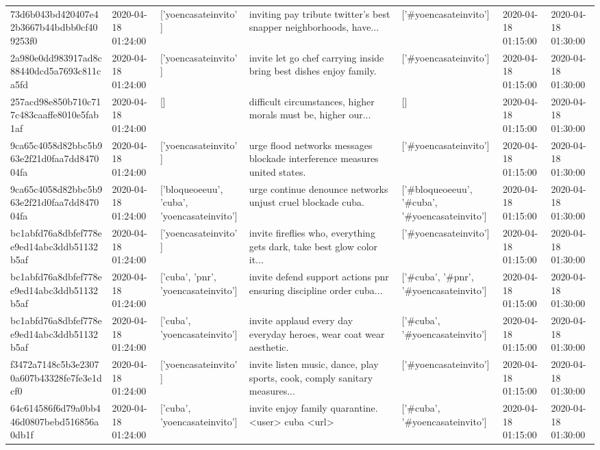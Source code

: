 \begin{tabular}{lllllll}
73d6b043bd420407e42b3667b44bdbb0cf409253f0 & 2020-04-18 01:24:00 & ['yoencasateinvito'] & inviting pay tribute twitter's best snapper neighborhoods, have... & ['#yoencasateinvito'] & 2020-04-18 01:15:00 & 2020-04-18 01:30:00 \\
2a980e0dd983917ad8c88440dcd5a7693c811ca5fd & 2020-04-18 01:24:00 & ['yoencasateinvito'] & invite let go chef carrying inside bring best dishes enjoy family. & ['#yoencasateinvito'] & 2020-04-18 01:15:00 & 2020-04-18 01:30:00 \\
257acd98e850b710c717c483caaffe8010e5fab1af & 2020-04-18 01:24:00 & [] & difficult circumstances, higher morals must be, higher our... & [] & 2020-04-18 01:15:00 & 2020-04-18 01:30:00 \\
9ca65c4058d82bbc5b963e2f21d0faa7dd847004fa & 2020-04-18 01:24:00 & ['yoencasateinvito'] & urge flood networks messages blockade interference measures united states. & ['#yoencasateinvito'] & 2020-04-18 01:15:00 & 2020-04-18 01:30:00 \\
9ca65c4058d82bbc5b963e2f21d0faa7dd847004fa & 2020-04-18 01:24:00 & ['bloqueoeeuu', 'cuba', 'yoencasateinvito'] & urge continue denounce networks unjust cruel blockade cuba. & ['#bloqueoeeuu', '#cuba', '#yoencasateinvito'] & 2020-04-18 01:15:00 & 2020-04-18 01:30:00 \\
bc1abfd76a8dbfef778ee9ed14abc3ddb51132b5af & 2020-04-18 01:24:00 & ['yoencasateinvito'] & invite fireflies who, everything gets dark, take best glow color it... & ['#yoencasateinvito'] & 2020-04-18 01:15:00 & 2020-04-18 01:30:00 \\
bc1abfd76a8dbfef778ee9ed14abc3ddb51132b5af & 2020-04-18 01:24:00 & ['cuba', 'pnr', 'yoencasateinvito'] & invite defend support actions pnr ensuring discipline order cuba... & ['#cuba', '#pnr', '#yoencasateinvito'] & 2020-04-18 01:15:00 & 2020-04-18 01:30:00 \\
bc1abfd76a8dbfef778ee9ed14abc3ddb51132b5af & 2020-04-18 01:24:00 & ['cuba', 'yoencasateinvito'] & invite applaud every day everyday heroes, wear coat wear aesthetic. & ['#cuba', '#yoencasateinvito'] & 2020-04-18 01:15:00 & 2020-04-18 01:30:00 \\
f3472a7148c5b3e23070a607b43328fe7fe3e1dcf0 & 2020-04-18 01:24:00 & ['yoencasateinvito'] & invite listen music, dance, play sports, cook, comply sanitary measures... & ['#yoencasateinvito'] & 2020-04-18 01:15:00 & 2020-04-18 01:30:00 \\
64c614586f6d79a0bb446d0807bebd516856a0db1f & 2020-04-18 01:24:00 & ['cuba', 'yoencasateinvito'] & invite enjoy family quarantine. <user> cuba <url> & ['#cuba', '#yoencasateinvito'] & 2020-04-18 01:15:00 & 2020-04-18 01:30:00 \\

\end{tabular}
